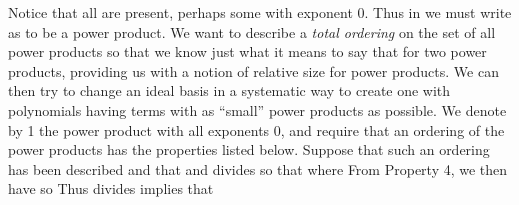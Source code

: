 \documentclass[11pt,oneside]{article}
\begin{document}
\begin{BookBody}
\noindent Notice that all  are present, perhaps some with exponent 0. Thus in \BookInline{F[x,\allowbreak y,\allowbreak z\},\allowbreak } we must write  as  to be a power product. We want to describe a\textit{ total ordering} \BookInline{<} on the set of all power products so that we know just what it means to say that  for two power products, providing us with a notion of relative size for power products. We can then try to change an ideal basis in a systematic way to create one with polynomials having terms  with as “small” power products  as possible. We denote by 1 the power product with all exponents 0, and require that an ordering of the power products has the properties listed below. Suppose that such an ordering has been described and that  and  divides  so that  where  From Property 4, we then have  so  Thus  divides  implies that

\end{BookBody}

\BookNarrativetrue
\end{document}
